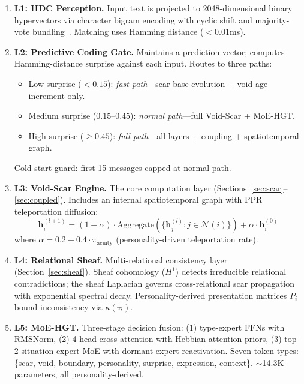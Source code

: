\documentclass[11pt]{article}
\begin{document}
\begin{enumerate}[leftmargin=*]
\item \textbf{L1: HDC Perception.} Input text is projected to 2048-dimensional binary hypervectors via character bigram encoding with cyclic shift and majority-vote bundling~\cite{kanerva2009}. Matching uses Hamming distance ($< 0.01$ms).

\item \textbf{L2: Predictive Coding Gate.} Maintains a prediction vector; computes Hamming-distance surprise against each input. Routes to three paths:
\begin{itemize}
\item Low surprise ($< 0.15$): \emph{fast path}---scar base evolution + void age increment only.
\item Medium surprise ($0.15$--$0.45$): \emph{normal path}---full Void-Scar + MoE-HGT.
\item High surprise ($\geq 0.45$): \emph{full path}---all layers + coupling + spatiotemporal graph.
\end{itemize}
Cold-start guard: first 15 messages capped at normal path.

\item \textbf{L3: Void-Scar Engine.} The core computation layer (Sections~\ref{sec:scar}--\ref{sec:coupled}). Includes an internal spatiotemporal graph with PPR teleportation diffusion:
\begin{equation}
\mathbf{h}_i^{(l+1)} = (1-\alpha) \cdot \text{Aggregate}(\{\mathbf{h}_j^{(l)} : j \in \mathcal{N}(i)\}) + \alpha \cdot \mathbf{h}_i^{(0)}
\end{equation}
where $\alpha = 0.2 + 0.4 \cdot \pi_{\text{acuity}}$ (personality-driven teleportation rate).

\item \textbf{L4: Relational Sheaf.} Multi-relational consistency layer (Section~\ref{sec:sheaf}). Sheaf cohomology ($H^1$) detects irreducible relational contradictions; the sheaf Laplacian governs cross-relational scar propagation with exponential spectral decay. Personality-derived presentation matrices $P_i$ bound inconsistency via $\kappa(\boldsymbol{\pi})$.

\item \textbf{L5: MoE-HGT.} Three-stage decision fusion: (1) type-expert FFNs with RMSNorm, (2) 4-head cross-attention with Hebbian attention priors, (3) top-2 situation-expert MoE with dormant-expert reactivation. Seven token types: \{scar, void, boundary, personality, surprise, expression, context\}. $\sim$14.3K parameters, all personality-derived.


\end{enumerate}
\end{document}
